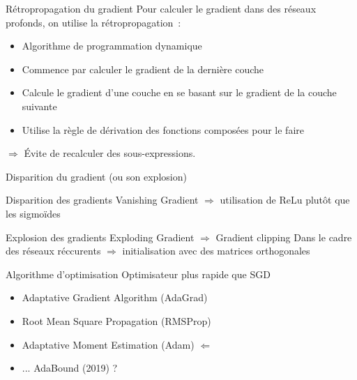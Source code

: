 \begin{frame}{Rétropropagation du gradient}
  Pour calculer le gradient dans des réseaux profonds, on utilise la rétropropagation~:

  \begin{itemize}
    \item Algorithme de programmation dynamique
    \item Commence par calculer le gradient de la dernière couche
    \item Calcule le gradient d'une couche en se basant sur le gradient de la couche suivante
    \item Utilise la règle de dérivation des fonctions composées pour le faire
  \end{itemize}

  $\Rightarrow$ Évite de recalculer des sous-expressions.
\end{frame}

\begin{frame}{Disparition du gradient (ou son explosion)}
\end{frame}

\begin{frame}{Disparition des gradients}
  Vanishing Gradient $\Rightarrow$ utilisation de ReLu plutôt que les sigmoïdes
  \vfill
\end{frame}

\begin{frame}{Explosion des gradients}
  Exploding Gradient $\Rightarrow$ Gradient clipping
  Dans le cadre des réseaux réccurents $\Rightarrow$ initialisation avec des matrices orthogonales
\end{frame}

\begin{frame}{Algorithme d'optimisation}
  Optimisateur plus rapide que SGD
  \begin{itemize}
    \item Adaptative Gradient Algorithm (AdaGrad)
    \item Root Mean Square Propagation (RMSProp)
    \item Adaptative Moment Estimation (Adam)    $\Leftarrow$
    \item ... AdaBound (2019) ?
  \end{itemize}
\end{frame}

